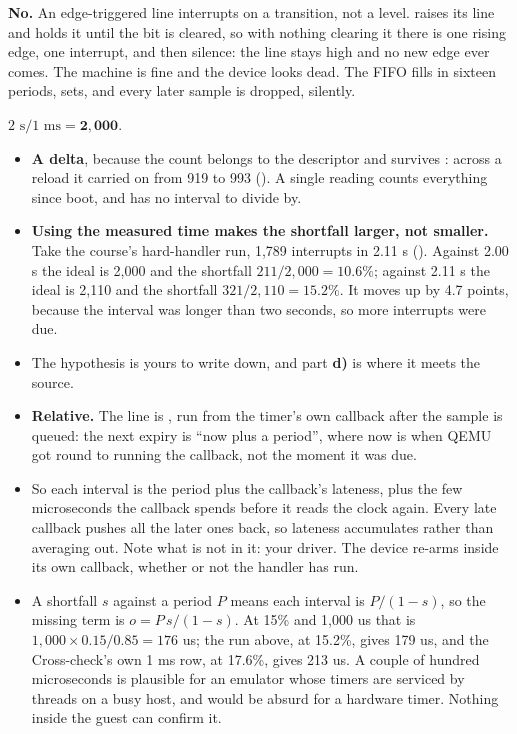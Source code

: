  \textbf{No.} An edge-triggered line interrupts on a transition, not a level. 
raises its line and holds it until the bit is cleared, so with nothing clearing it there is one
rising edge, one interrupt, and then silence: the line stays high and no new edge ever comes. The
machine is fine and the device looks dead. The FIFO fills in sixteen periods,  sets,
and every later sample is dropped, silently.


 $2\text{ s} / 1\text{ ms} = \mathbf{2{,}000}$.

\begin{itemize}
  \item \textbf{A delta}, because the count belongs to the descriptor and survives :
    across a reload it carried on from 919 to 993 (). A single reading counts
    everything since boot, and has no interval to divide by.
  \item \textbf{Using the measured time makes the shortfall larger, not smaller.} Take the course's
    hard-handler run, 1,789 interrupts in 2.11 s (). Against 2.00 s the ideal is
    2,000 and the shortfall $211/2{,}000 = 10.6\%$; against 2.11 s the ideal is 2,110 and the
    shortfall $321/2{,}110 = 15.2\%$. It moves up by 4.7 points, because the interval was longer
    than two seconds, so more interrupts were due.
  \item The hypothesis is yours to write down, and part \textbf{d)} is where it meets the source.
\end{itemize}

\begin{itemize}
  \item \textbf{Relative.} The line is , run from the timer's own callback after
    the sample is queued: the next expiry is ``now plus a period'', where now is when QEMU got round
    to running the callback, not the moment it was due.
  \item So each interval is the period plus the callback's lateness, plus the few microseconds the
    callback spends before it reads the clock again. Every late callback pushes all the later ones
    back, so lateness accumulates rather than averaging out. Note what is not in it: your driver.
    The device re-arms inside its own callback, whether or not the handler has run.
  \item A shortfall $s$ against a period $P$ means each interval is $P/(1-s)$, so the missing term is
    $o = P\,s/(1-s)$. At 15\% and 1,000 us that is $1{,}000 \times 0.15/0.85 = 176$ us; the run above,
    at 15.2\%, gives 179 us, and the Cross-check's own 1 ms row, at 17.6\%, gives 213 us. A couple
    of hundred microseconds is plausible for an emulator whose timers are serviced by threads on a
    busy host, and would be absurd for a hardware timer. Nothing inside the guest can confirm it.
\end{itemize}


